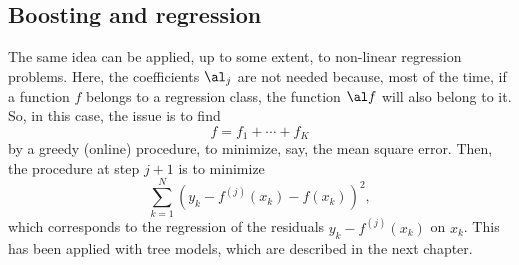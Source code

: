 \subsection{Boosting and regression}
The same idea can be applied, up to some extent, to non-linear regression problems. Here,
the coefficients  $\al_j$ are not needed because, most of the time,
if a function $f$ belongs to a regression class, the function $\al f$
will also belong to it. So, in this case, the issue is to find 
$$
f = f_1 + \cdots + f_K$$
by a greedy (online) procedure, to minimize, say, the mean square
error. Then, the procedure at step $j+1$ is to minimize
$$
\sum_{k=1}^N (y_k - f^{(j)}(x_k) - f(x_k))^2,
$$
which corresponds to the regression of the residuals $y_k -
f^{(j)}(x_k)$ on $x_k$. This has been applied with tree models, which are described in the next chapter.

